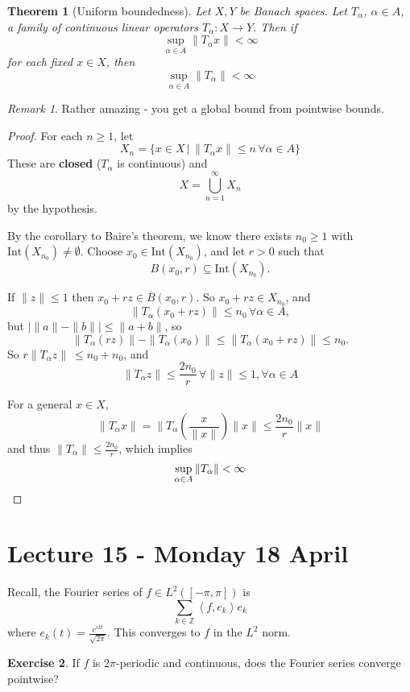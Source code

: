 \documentclass[10pt, oneside, reqno]{amsart}
\theoremstyle{plain}%
\newtheorem{thm}{Theorem}[section]
\theoremstyle{definition}
\newtheorem{exer}[thm]{Exercise}
\theoremstyle{remark}
\newtheorem*{rem}{Remark}
\newcommand{\given}{ \, | \,}
\newcommand{\Z}{\mathbb{Z}}
\newcommand{\iprod}[1]{\left\langle #1 \right\rangle}
\begin{document}
\begin{thm}[Uniform boundedness]
	Let $X, Y$ be Banach spaces.  Let $T_\alpha$, $\alpha \in A$, a family of continuous linear operators $T_\alpha : X \rightarrow Y$.  Then if \[
		\sup_{\alpha \in A} \| T_\alpha x \| < \infty
	\] for each fixed $x \in X$, then \[
		\sup_{\alpha \in A} \| T_\alpha \| < \infty
	\]
\end{thm}
\begin{rem}
	Rather amazing - you get a global bound from pointwise bounds.
\end{rem}
\begin{proof}
	For each $n \geq 1$, let \[
		X_n = \{ x \in X \given \| T_\alpha x \| \leq n \, \forall \alpha \in A \}
	\]  These are \textbf{closed} ($T_{\alpha}$ is continuous) and \[
		X = \bigcup_{n=1}^\infty X_n
	\] by the hypothesis.
	
	By the corollary to Baire's theorem, we know there exists $n_0 \geq 1$ with $\text{Int}(X_{n_0}) \neq \emptyset$.  Choose $x_0 \in \text{Int}(X_{n_0})$, and let $r > 0$ such that \[
		B(x_0, r) \subseteq \text{Int}(X_{n_0}).  
	\]  
	
	If $\| z \| \leq 1$ then $x_0 + rz \in \overline B (x_0, r)$. So $x_0 + rz \in X_{n_0}$, and \[
		\| T_\alpha(x_0 + rz) \| \leq n_0 \, \forall \alpha \in A,
	\]  but $| \| a \| - \| b \| | \leq \| a + b \|$, so \[
		\| T_\alpha (rz) \| - \| T_\alpha (x_0) \| \leq \| T_\alpha (x_0 + rz) \| \leq n_0.
	\]
	So $r \| T_\alpha z \| \ \leq n_0 + n_0$, and \[
		\| T_\alpha z \| \leq \frac{2 n_0}{r} \, \forall \| z \| \leq 1, \forall \alpha \in A
	\]
	
	For a general $x \in X$, \[
		\| T_\alpha x \| = \| T_\alpha ( \frac{x}{\| x \|}) \| x \| \leq \frac{2 n_0}{r} \| x \|
	\] and thus $\|T_\alpha \| \leq \frac{2 n_0}{r}$, which implies \[
		\sup_{\alpha \in A} \| T_\alpha \| < \infty \qedhere
	\]
	
	
\end{proof}

\section{Lecture 15 - Monday 18 April} %
\label{sec:lecture_15_monday_18_april}
Recall, the Fourier series of $f \in L^2([-\pi, \pi])$ is \[
	\sum_{k \in \Z} \iprod{f, e_k} e_k
\] where $e_k(t) = \frac{e^{ikt}}{\sqrt{2 \pi}}$.  This converges to $f$ in the $L^2$ norm.

\begin{exer}
	If $f$ is $2\pi$-periodic and continuous, does the Fourier series converge pointwise?  
\end{exer}
\end{document}
